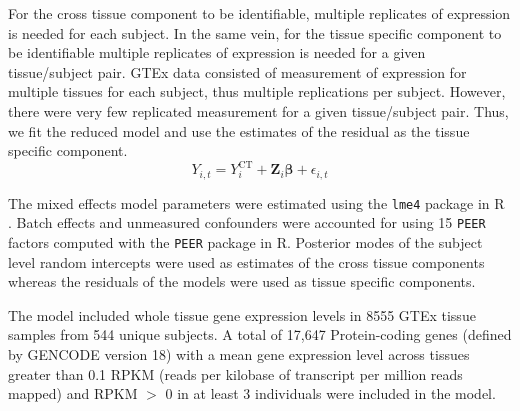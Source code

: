 \documentclass[10pt,letterpaper]{article}
\begin{document}
For the cross tissue component to be identifiable, multiple replicates of expression is needed for each subject. In the same vein, for the tissue specific component to be identifiable multiple replicates of expression is needed for a given tissue/subject pair. GTEx\cite{Ardlie_2015}  data consisted of measurement of expression for multiple tissues for each subject, thus multiple replications per subject. However, there were very few replicated measurement for a given tissue/subject pair. Thus, we fit the reduced model and use the estimates of the residual as the tissue specific component.
%
\[Y_{i,t} =  Y_{i}^{\text{CT}}   + \mathbf{Z}_i \boldsymbol{\beta} + \epsilon_{i,t}  \] 
%


The mixed effects model parameters were estimated using the \texttt{lme4} package \cite{Bates_2015a} in R \cite{R_Core_Team_2015}. Batch effects and unmeasured confounders were accounted for using 15 \texttt{PEER} factors computed with the \texttt{PEER} \cite{Stegle_2012} package in R. Posterior modes of the subject level random intercepts were used as estimates of the cross tissue components whereas the residuals of the models were used as tissue specific components.

The model included whole tissue gene expression levels in 8555 GTEx
tissue samples from 544 unique subjects. A total of 17,647
Protein-coding genes (defined by GENCODE \cite{Harrow_2012} version 18) with a
mean gene expression level across tissues greater than 0.1 RPKM (reads
per kilobase of transcript per million reads mapped) and RPKM $>$ 0 in at least 3 individuals were included in
the model. 

\end{document}
